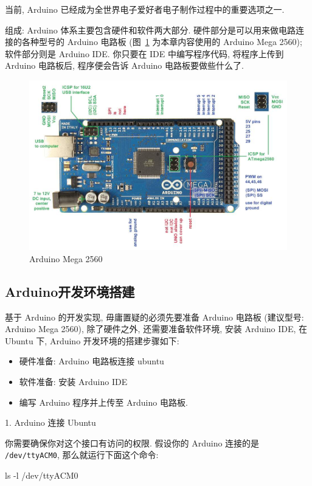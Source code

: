 \documentclass[openany, fontset=windowsold]{ctexbook}
\theoremstyle{kaiti}
\theoremstyle{normal}
\begin{document}
当前, Arduino 已经成为全世界电子爱好者电子制作过程中的重要选项之一.

组成: Arduino 体系主要包含硬件和软件两大部分. 硬件部分是可以用来做电路连接的各种型号的 Arduino 电路板 (图~\ref{fig:ArduinoMega2560} 为本章内容使用的 Arduino Mega 2560); 软件部分则是 Arduino IDE. 你只要在 IDE 中编写程序代码, 将程序上传到 Arduino 电路板后, 程序便会告诉 Arduino 电路板要做些什么了.

\begin{figure}[!ht]
  \centering
  \includegraphics[width=.9\textwidth]{ArduinoMega2560.png}
  \caption{Arduino Mega 2560}
  \label{fig:ArduinoMega2560}
\end{figure}

\subsection{Arduino开发环境搭建}

基于 Arduino 的开发实现, 毋庸置疑的必须先要准备 Arduino 电路板 (建议型号: Arduino Mega 2560), 除了硬件之外, 还需要准备软件环境, 安装 Arduino IDE, 在 Ubuntu 下, Arduino 开发环境的搭建步骤如下:

\begin{itemize}
  \item 硬件准备: Arduino 电路板连接 ubuntu
  \item 软件准备: 安装 Arduino IDE
  \item 编写 Arduino 程序并上传至 Arduino 电路板.
\end{itemize}

1. Arduino 连接 Ubuntu

你需要确保你对这个接口有访问的权限. 假设你的 Arduino 连接的是 \verb|/dev/ttyACM0|, 那么就运行下面这个命令: 

\begin{bash}
  ls -l /dev/ttyACM0
\end{bash}
\end{document}
